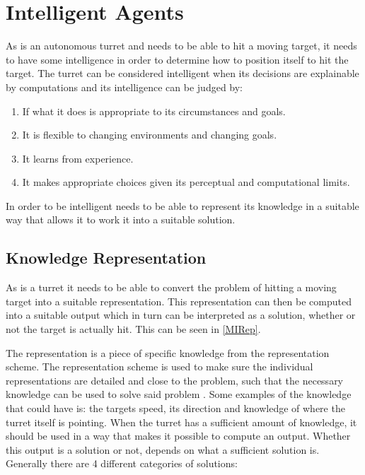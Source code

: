 \section{Intelligent Agents}
 
As \namep is an autonomous turret and needs to be able to hit a moving target,
it needs to have some intelligence in order to determine how to position itself
to hit the target. The turret can be considered intelligent
\citep[ch.1.1]{MIBook} when its decisions are explainable by computations and
its intelligence can be judged by:

\begin{enumerate}
  \item If what it does is appropriate to its circumstances and goals.
  \item It is flexible to changing environments and changing goals.
  \item It learns from experience.
  \item It makes appropriate choices given its perceptual and computational
  limits.
\end{enumerate}

In order to be intelligent \name needs to be able to represent its knowledge in
a suitable way that allows it to work it into a suitable solution. 

\subsection{Knowledge Representation}\label{KR}

As \name is a turret it needs to be able to convert the problem of hitting a
moving target into a suitable representation. This representation can then be
computed into a suitable output which in turn can be interpreted as
a solution, whether or not the target is actually hit. This can be seen in
\autoref{MIRep}.


The representation is a piece of specific knowledge from the representation
scheme. The representation scheme is used to make sure the individual
representations are detailed and close to the problem, such that the necessary
knowledge can be used to solve said problem \citep{MIBook}. Some examples of the
knowledge that \name could have is: the targets speed, its direction and
knowledge of where the turret itself is pointing. When the turret has a
sufficient amount of knowledge, it should be used in a way that makes it
possible to compute an output. Whether this output is a solution or not, depends
on what a sufficient solution is. Generally there are 4 different categories of
solutions:


